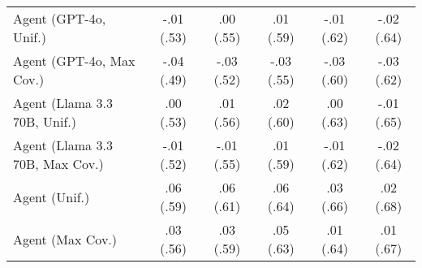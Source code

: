 \begin{table}[h!]
\begin{tabular}{lccccc}
    Agent (GPT-4o, Unif.) & -.01 {\small (.53)} & .00 {\small (.55)} & .01 {\small (.59)} & -.01 {\small (.62)} & -.02 {\small (.64)} \\
    Agent (GPT-4o, Max Cov.) & -.04 {\small (.49)} & -.03 {\small (.52)} & -.03 {\small (.55)} & -.03 {\small (.60)} & -.03 {\small (.62)} \\
    Agent (Llama 3.3 70B, Unif.) & .00 {\small (.53)} & .01 {\small (.56)} & .02 {\small (.60)} & .00 {\small (.63)} & -.01 {\small (.65)} \\
    Agent (Llama 3.3 70B, Max Cov.) & -.01 {\small (.52)} & -.01 {\small (.55)} & .01 {\small (.59)} & -.01 {\small (.62)} & -.02 {\small (.64)} \\
    Agent (Unif.) & \cellcolor{bronze!30}.06 {\small (.59)} & \cellcolor{bronze!30}.06 {\small (.61)} & \cellcolor{bronze!30}.06 {\small (.64)} & \cellcolor{bronze!30}.03 {\small (.66)} & .02 {\small (.68)} \\
    Agent (Max Cov.) & .03 {\small (.56)} & .03 {\small (.59)} & .05 {\small (.63)} & .01 {\small (.64)} & .01 {\small (.67)} \\
    \bottomrule
    \end{tabular}
\end{table}